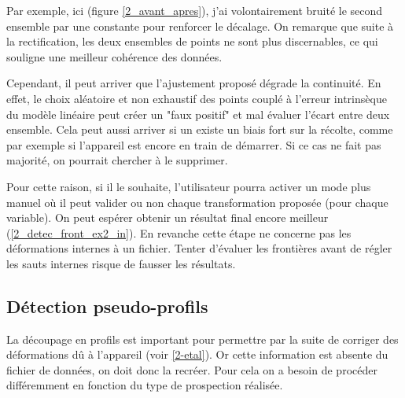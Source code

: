 \documentclass[12pt]{article}
\begin{document}
    Par exemple, ici (figure \ref{2_avant_apres}), j'ai volontairement bruité le second ensemble par une constante pour renforcer le décalage. On remarque que suite à la rectification, les deux ensembles de points ne sont plus discernables, ce qui souligne une meilleur cohérence des données.

    Cependant, il peut arriver que l'ajustement proposé dégrade la continuité. En effet, le choix aléatoire et non exhaustif des points couplé à l'erreur intrinsèque du modèle linéaire peut créer un "faux positif" et mal évaluer l'écart entre deux ensemble. Cela peut aussi arriver si un existe un biais fort sur la récolte, comme par exemple si l'appareil est encore en train de démarrer. Si ce cas ne fait pas majorité, on pourrait chercher à le supprimer.
    
    \label{2_detec_front_ex2_out} Pour cette raison, si il le souhaite, l'utilisateur pourra activer un mode plus manuel où il peut valider ou non chaque transformation proposée (pour chaque variable). On peut espérer obtenir un résultat final encore meilleur (\ref{2_detec_front_ex2_in}). En revanche cette étape ne concerne pas les déformations internes à un fichier. Tenter d'évaluer les frontières avant de régler les sauts internes risque de fausser les résultats.

\newpage
\subsection{Détection pseudo-profils}

    La découpage en profils est important pour permettre par la suite de corriger des déformations dû à l'appareil (voir \ref{2-etal}). Or cette information est absente du fichier de données, on doit donc la recréer. Pour cela on a besoin de procéder différemment en fonction du type de prospection réalisée.
\end{document}
